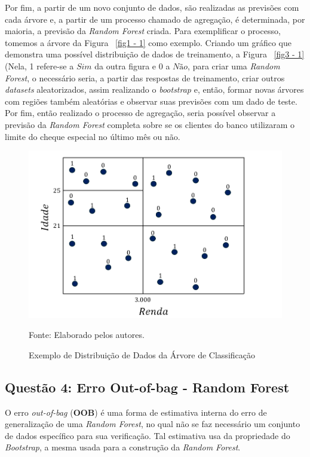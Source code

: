 \documentclass[a4paper,12pt]{article}[abntex2]
\begin{document}
Por fim, a partir de um novo conjunto de dados, são realizadas as previsões com cada árvore e, a partir de um processo chamado de agregação, é determinada, por maioria, a previsão da \textit{Random Forest} criada. Para exemplificar o processo, tomemos a árvore da Figura ~\ref{fig1 - 1} como exemplo. Criando um gráfico que demonstra uma possível distribuição de dados de treinamento, a Figura ~\ref{fig3 - 1} (Nela, 1 refere-se a $Sim$ da outra figura e 0 a $Não$, para criar uma \textit{Random Forest}, o necessário seria, a partir das respostas de treinamento, criar outros \textit{datasets} aleatorizados, assim realizando o \textit{bootstrap} e, então, formar novas árvores com regiões também aleatórias e observar suas previsões com um dado de teste. Por fim, então realizado o processo de agregação, seria possível observar a previsão da \textit{Random Forest} completa sobre se os clientes do banco utilizaram o limite do cheque especial no último mês ou não.

\begin{figure}[H]
    \centering
    \caption{Exemplo de Distribuição de Dados da Árvore de Classificação} 
    \includegraphics[width=1.0\textwidth]{APS/fig1 - 3.png}
    \label{fig1 - 3}
    
    \footnotesize{Fonte: Elaborado pelos autores.}
\end{figure}
\newpage
\subsection*{Questão 4: Erro Out-of-bag - Random Forest}

O erro \textit{out-of-bag} (\textbf{OOB}) é uma forma de estimativa interna do erro de generalização de uma \textit{Random Forest}, no qual não se faz necessário um conjunto de dados específico para sua verificação. Tal estimativa usa da propriedade do \textit{Bootstrap}, a mesma usada para a construção da \textit{Random Forest}.
\end{document}
